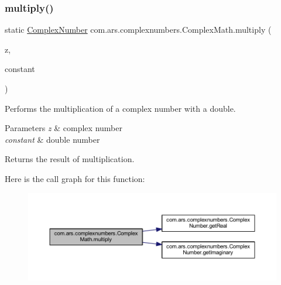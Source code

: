\subsubsection{\texorpdfstring{multiply()}{multiply()}\hspace{0.1cm}{\footnotesize\ttfamily [2/2]}}
{\footnotesize\ttfamily static \hyperlink{classcom_1_1ars_1_1complexnumbers_1_1_complex_number}{Complex\+Number} com.\+ars.\+complexnumbers.\+Complex\+Math.\+multiply (\begin{DoxyParamCaption}\item[{\hyperlink{classcom_1_1ars_1_1complexnumbers_1_1_complex_number}{Complex\+Number}}]{z,  }\item[{double}]{constant }\end{DoxyParamCaption})\hspace{0.3cm}{\ttfamily [static]}}

Performs the multiplication of a complex number with a double. 
\begin{DoxyParams}{Parameters}
{\em z} & complex number \\
\hline
{\em constant} & double number \\
\hline
\end{DoxyParams}
\begin{DoxyReturn}{Returns}
the result of multiplication. 
\end{DoxyReturn}
Here is the call graph for this function\+:
\nopagebreak
\begin{figure}[H]
\begin{center}
\leavevmode
\includegraphics[width=350pt]{classcom_1_1ars_1_1complexnumbers_1_1_complex_math_aea5e553e5a5e3e519df64cb155699198_cgraph}
\end{center}
\end{figure}
\hypertarget{classcom_1_1ars_1_1complexnumbers_1_1_complex_math_a0e31bcd8237beabdee3f1480e8667d83}{}\label{classcom_1_1ars_1_1complexnumbers_1_1_complex_math_a0e31bcd8237beabdee3f1480e8667d83} 
